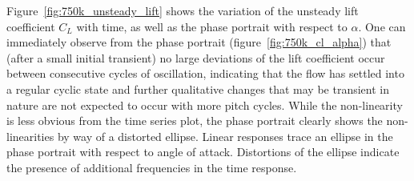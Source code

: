 Figure~\ref{fig:750k_unsteady_lift} shows the variation of the unsteady lift coefficient $C_{L}$ with time, as well as the phase portrait with respect to $\alpha$. One can immediately observe from the phase portrait (figure~\ref{fig:750k_cl_alpha}) that (after a small initial transient) no large deviations of the lift coefficient occur between consecutive cycles of oscillation, indicating that the flow has settled into a regular cyclic state and further qualitative changes that may be transient in nature are not expected to occur with more pitch cycles. While the non-linearity is less obvious from the time series plot, the phase portrait clearly shows the non-linearities by way of a distorted ellipse. Linear responses trace an ellipse in the phase portrait with respect to angle of attack. Distortions of the ellipse indicate the presence of additional frequencies in the time response.

